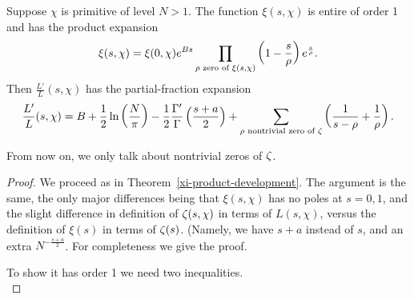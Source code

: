 \begin{thm}
Suppose $\chi$ is primitive of level $N>1$.
The function $\xi(s,\chi)$ is entire of order 1 and has the product expansion
\[
\xi(s,\chi)=\xi(0,\chi)e^{Bs}\prod_{\rho\text{ zero of }\xi(s,\chi)} \left( {1-\frac s{\rho}} \right)e^{\frac s{\rho}}.
\]
Then $\frac{L'}{L}(s,\chi)$ has the partial-fraction expansion
\[
\frac{L'}{L}(s,\chi)=B+\rc{2}\ln\pf{N}{\pi}%
-\rc{2}\frac{\Ga'}{\Ga}\pf{s+a}{2}
+\sum_{\rh\text{ nontrivial zero of }\zeta}\pa{\rc{s-\rh}+\rc{\rh}}.
\]
\end{thm}
From now on, we only talk about nontrivial zeros of $\zeta$.
\begin{proof}
We proceed as in Theorem~\ref{xi-product-development}. 
The argument is the same, the only major differences being that $\xi(s,\chi)$ has no poles at $s=0,1$, and the slight difference in definition of $\zeta(s,\chi)$ in terms of $L(s,\chi)$, versus the definition of $\xi(s)$ in terms of $\zeta(s)$. (Namely, we have $s+a$ instead of $s$, and an extra $N^{-\frac{s+a}2}$. For completeness we give the proof.

To show it has order 1 we need two inequalities.\\


\end{proof}
